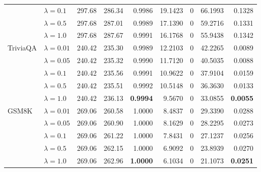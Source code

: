 \begin{table}[t]
{\begin{tabular}{l l rrrrrrr}
 & $\lambda{=}0.1$ & 297.68 & 286.34 & 0.9986 & 19.1423 & \cellcolor{cyan!12} $0$ & 66.1993 & 0.1328 \\
 & $\lambda{=}0.5$ & 297.68 & 287.01 & 0.9989 & 17.1390 & \cellcolor{cyan!12} $0$ & 59.2716 & 0.1331 \\
 & $\lambda{=}1.0$ & 297.68 & 287.67 & 0.9991 & 16.1768 & \cellcolor{cyan!12} $0$ & 55.9438 & 0.1342 \\
\midrule
TriviaQA & $\lambda{=}0.01$ & 240.42 & 235.30 & 0.9989 & 12.2103 & \cellcolor{cyan!12} $0$ & 42.2265 & 0.0089 \\
 & $\lambda{=}0.05$ & 240.42 & 235.32 & 0.9990 & 11.7120 & \cellcolor{cyan!12} $0$ & 40.5035 & 0.0088 \\
 & $\lambda{=}0.1$ & 240.42 & 235.56 & 0.9991 & 10.9622 & \cellcolor{cyan!12} $0$ & 37.9104 & 0.0159 \\
 & $\lambda{=}0.5$ & 240.42 & 235.51 & 0.9992 & 10.5148 & \cellcolor{cyan!12} $0$ & 36.3630 & 0.0133 \\
 & $\lambda{=}1.0$ & 240.42 & 236.13 & \textbf{0.9994} & 9.5670 & \cellcolor{cyan!12} $0$ & 33.0855 & \textbf{0.0055} \\
\midrule
GSM8K & $\lambda{=}0.01$ & 269.06 & 260.58 & 1.0000 & 8.4837 & \cellcolor{cyan!12} $0$ & 29.3390 & 0.0288 \\
 & $\lambda{=}0.05$ & 269.06 & 260.90 & 1.0000 & 8.1629 & \cellcolor{cyan!12} $0$ & 28.2295 & 0.0273 \\
 & $\lambda{=}0.1$ & 269.06 & 261.22 & 1.0000 & 7.8431 & \cellcolor{cyan!12} $0$ & 27.1237 & 0.0256 \\
 & $\lambda{=}0.5$ & 269.06 & 262.15 & 1.0000 & 6.9092 & \cellcolor{cyan!12} $0$ & 23.8939 & 0.0270 \\
 & $\lambda{=}1.0$ & 269.06 & 262.96 & \textbf{1.0000} & 6.1034 & \cellcolor{cyan!12} $0$ & 21.1073 & \textbf{0.0251} \\
\bottomrule
\end{tabular}}
\end{table}